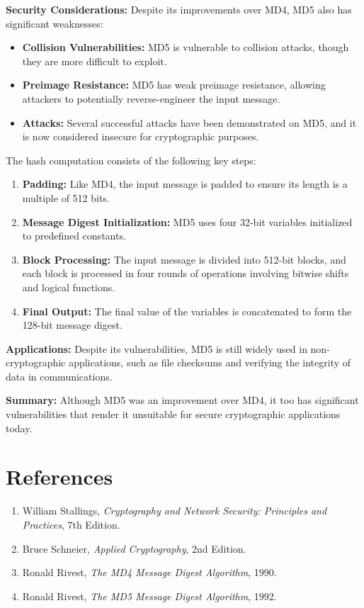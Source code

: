 \documentclass[a4paper,12pt]{article}
\begin{document}
\textbf{Security Considerations:} Despite its improvements over MD4, MD5 also has significant weaknesses:
\begin{itemize}
    \item \textbf{Collision Vulnerabilities:} MD5 is vulnerable to collision attacks, though they are more difficult to exploit.
    \item \textbf{Preimage Resistance:} MD5 has weak preimage resistance, allowing attackers to potentially reverse-engineer the input message.
    \item \textbf{Attacks:} Several successful attacks have been demonstrated on MD5, and it is now considered insecure for cryptographic purposes.
\end{itemize}

The hash computation consists of the following key steps:
\begin{enumerate}
    \item \textbf{Padding:} Like MD4, the input message is padded to ensure its length is a multiple of 512 bits.
    \item \textbf{Message Digest Initialization:} MD5 uses four 32-bit variables initialized to predefined constants.
    \item \textbf{Block Processing:} The input message is divided into 512-bit blocks, and each block is processed in four rounds of operations involving bitwise shifts and logical functions.
    \item \textbf{Final Output:} The final value of the variables is concatenated to form the 128-bit message digest.
\end{enumerate}

\textbf{Applications:} Despite its vulnerabilities, MD5 is still widely used in non-cryptographic applications, such as file checksums and verifying the integrity of data in communications.

\vspace{0.5cm}  %

\textbf{Summary:} Although MD5 was an improvement over MD4, it too has significant vulnerabilities that render it unsuitable for secure cryptographic applications today.

\newpage
\section*{References}
\begin{enumerate}
    \item William Stallings, \textit{Cryptography and Network Security: Principles and Practices}, 7th Edition.
    \item Bruce Schneier, \textit{Applied Cryptography}, 2nd Edition.
    \item Ronald Rivest, \textit{The MD4 Message Digest Algorithm}, 1990.
    \item Ronald Rivest, \textit{The MD5 Message Digest Algorithm}, 1992.
\end{enumerate}
\end{document}
